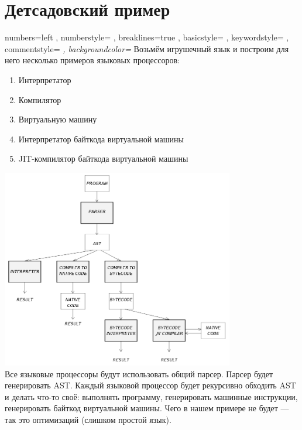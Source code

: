 \documentclass[11pt]{book}
\begin{document}
\chapter{Детсадовский пример}
    { numbers=left
    , numberstyle=\footnotesize\ttfamily\color{cblue3}
    , breaklines=true
    , basicstyle=\footnotesize\ttfamily\color{cblue1}
    , keywordstyle=\footnotesize\ttfamily\color{cblue2}
    , commentstyle=\itshape\color{cgreen}
    , backgroundcolor=\color{cgray}
    }
\lstset{style=src}
Возьмём игрушечный язык и построим для него несколько примеров языковых процессоров:
\begin{enumerate}
\item Интерпретатор
\item Компилятор
\item Виртуальную машину
\item Интерпретатор байткода виртуальной машины
\item JIT-компилятор байткода виртуальной машины
\end{enumerate}
\includegraphics[width=4in]{pic/scheme.png}
\\
Все языковые процессоры будут использовать общий парсер.
Парсер будет генерировать AST.
Каждый языковой процессор будет рекурсивно обходить AST и делать что-то своё:
выполнять программу, генерировать машинные инструкции, генерировать байткод виртуальной машины.
Чего в нашем примере не будет --- так это оптимизаций (слишком простой язык).
\end{document}
